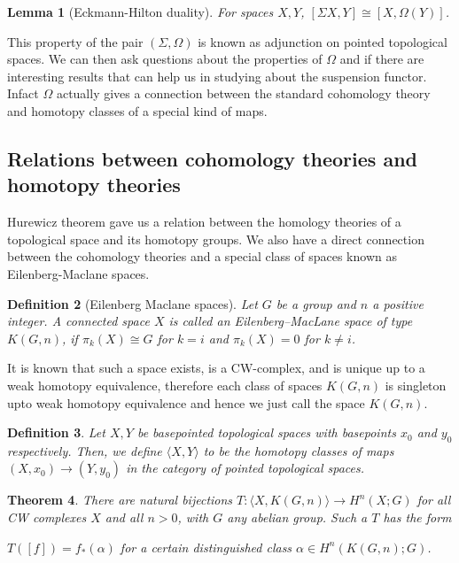 \documentclass[12pt]{extarticle}
\numberwithin{equation}{section}
\newtheorem{thm}{Theorem}[section]
\newtheorem{lem}[thm]{Lemma}
\newtheorem{defn}[thm]{Definition}
\begin{document}
\begin{lem}[Eckmann-Hilton duality]
For spaces $X,Y$, $[\Sigma X, Y]\cong [X, \Omega(Y)]$.
\end{lem}

This property of the pair $(\Sigma,\Omega)$ is known as adjunction on pointed topological spaces. We can then ask questions about the properties of $\Omega$ and if there are interesting results that can help us in studying about the suspension functor. Infact $\Omega$ actually gives a connection between the standard cohomology theory and homotopy classes of a special kind of maps.\\

\subsection{Relations between cohomology theories and homotopy theories}

Hurewicz theorem gave us a relation between the homology theories of a topological space and its homotopy groups. We also have a direct connection between the cohomology theories and a special class of spaces known as Eilenberg-Maclane spaces.\\

\begin{defn}[Eilenberg Maclane spaces]
Let $G$ be a group and $n$ a positive integer. A connected space $X$ is called an Eilenberg–MacLane space of type $K(G,n)$, if $\pi_k(X)\cong G$ for $k=i$ and $\pi_k(X)=0$ for $k\neq i$.
\end{defn}

It is known that such a space exists, is a CW-complex, and is unique up to a weak homotopy equivalence, therefore each class of spaces $K(G,n)$ is singleton upto weak homotopy equivalence and hence we just call the space $K(G,n)$.\\

\begin{defn}
Let $X,Y$ be basepointed topological spaces with basepoints $x_0$ and $y_0$ respectively. Then, we define $\langle X,Y \rangle$ to be the homotopy classes of maps $(X,x_0)\to (Y,y_0)$ in the category of pointed topological spaces.
\end{defn}

\begin{thm}\cite[p.~393]{Hatcher}
There are natural bijections $T :\langle X,K(G,n) \rangle\to H^n(X;G)$ for all CW complexes $X$ and all $n > 0$, with $G$ any abelian group. Such a $T$ has the form

$T([f]) = f_*(\alpha)$ for a certain distinguished class $\alpha \in H^n(K(G,n);G)$.
\end{thm}
\end{document}
